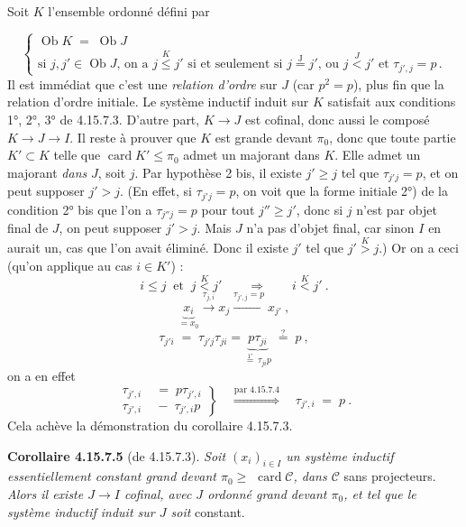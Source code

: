 \documentclass[11pt]{article}
\newcommand{\printedpage}[1]{\marginpar{\footnotesize p.~#1}}
\newcommand{\msp}[1]{\marginpar{\footnotesize [#1]}}
\newcommand{\cC}{\mathcal{C}}
\newcommand{\Ob}{\operatorname{Ob}}
\newcommand{\card}{\operatorname{card}}
\begin{document}
Soit $K$ l'ensemble ordonné défini par

\msp{page 447}
\[
\begin{cases}
\Ob K \;=\; \Ob J \\
\text{si } j,j' \in \Ob J\text{, on a } j \overset{K}{\leqslant} j' \text{ si et seulement si } j \overset{\mathrm{J}}{=} j'\text{, ou } j \overset{J}{<} j' \text{ et } \tau_{j',j} = p\,.
\end{cases}
\]
Il est immédiat que c'est une \textit{relation d'ordre} sur $J$ (car $p^2 = p$), plus fin que la relation d'ordre initiale. Le système inductif induit sur $K$ satisfait aux conditions 1°, 2°, 3° de 4.15.7.3. D'autre part, $K \longrightarrow J$ est cofinal, donc aussi le composé $K \longrightarrow J \longrightarrow I$. Il reste à prouver que $K$ est grande devant $\pi_0$, donc que toute partie $K' \subset K$ telle que $\card K' \leqslant \pi_0$ admet un majorant dans $K$. Elle admet un majorant \textit{dans} $J$, soit $j$. Par hypothèse 2 bis, il existe $j' \geqslant j$ tel que $\tau_{j'j} = p$, et on peut supposer $j' > j$. (En effet, si $\tau_{j'j} = p$, on voit que
\printedpage{172}
\msp{page 448}
la forme initiale 2°) de la condition 2° bis que l'on a $\tau_{j''j} = p$ pour tout $j'' \geqslant j'$, donc si $j$ n'est par objet final de $J$, %
on peut supposer $j' > j$. Mais $J$ n'a pas d'objet final, car sinon $I$ en aurait un, cas que l'on avait éliminé. Donc il existe $j'$ tel que $j' \overset{K}{>} j$.) Or on a ceci (qu'on applique au cas $i \in K'$) :
\[
i \leqslant j \ \text{ et } \ j \overset{K}{<} j' \qquad \Longrightarrow \qquad i \overset{K}{<} j'\ .
\]
\[
\underbrace{x_i}_{= x_0} \xrightarrow{\tau_{j,i}} x_j \xrightarrow{\tau_{j',j}=p} x_{j'}\ ,
\]
\[
\tau_{j'i} \;=\; \tau_{j'j}\tau_{ji} = \underbrace{p\tau_{ji}}_{\overset{\text{1°}}{=}\,\tau_{ji}p} \;\overset{?}{=}\; p\ ,
\]
on a en effet
\[
\left.
\begin{aligned}
\tau_{j',i} &\;=\; p\tau_{j',i} \\
\tau_{j',i} &\;-\; \tau_{j',i}p %
\end{aligned}
\right\}
\quad \overset{\text{par 4.15.7.4}}{\Longrightarrow} \quad %
\tau_{j',i} \;=\; p\ .
\]
Cela achève la démonstration du corollaire 4.15.7.3.

\textbf{Corollaire 4.15.7.5} (de 4.15.7.3). \textit{Soit $(x_i)_{i\in I}$ un système inductif essentiellement constant grand devant $\pi_0 \geqslant$} $\card\cC$\textit{, dans $\cC$} sans projecteurs. \textit{Alors il existe $J \longrightarrow I$ cofinal, avec $J$ ordonné grand devant $\pi_0$, et tel que le système inductif induit sur $J$ soit} constant.
\end{document}
